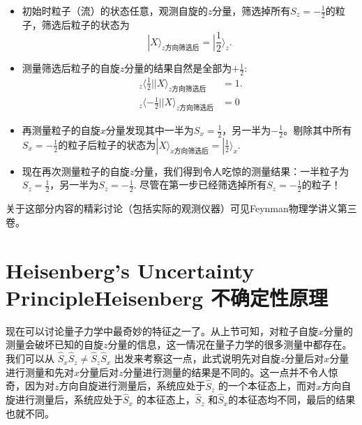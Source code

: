 \begin{itemize}
\item	初始时粒子（流）的状态任意，观测自旋的$z$分量，筛选掉所有$S_z = -\frac{1}{2}$的粒子，筛选后粒子的状态为
	\begin{equation}
		|X\rangle_{z\text{方向筛选后}} = |\frac{1}{2} \rangle_z.
	\label{equ8.58}
	\end{equation}
\item	测量筛选后粒子的自旋$z$分量的结果自然是全部为$+\frac{1}{2}$:
	\begin{align}
		\ _z\langle \frac{1}{2} || X \rangle_{z\text{方向筛选后}} &= 1.
	\label{equ8.59} \\
		\ _z \langle -\frac{1}{2} | |X \rangle_{z\text{方向筛选后}} &= 0
	\label{equ8.60}
	\end{align}
\item	再测量粒子的自旋$x$分量发现其中一半为$S_x = \frac{1}{2}$，另一半为$-\frac{1}{2}$。剔除其中所有$S_x = -\frac{1}{2}$的粒子后粒子的状态为$|X\rangle_{x\text{方向筛选后}} = |\frac{1}{2} \rangle_x$.
\item 	现在再次测量粒子的自旋$z$分量，我们得到令人吃惊的测量结果：一半粒子为$S_z = \frac{1}{2}$，另一半为$S_z = -\frac{1}{2}$. 尽管在第一步已经筛选掉所有$S_z = -\frac{1}{2}$的粒子！
\end{itemize}
关于这部分内容的精彩讨论（包括实际的观测仪器）可见Feynman物理学讲义第三卷。

\section[Heisenberg 不确定性原理]{Heisenberg’s Uncertainty PrincipleHeisenberg \quad 不确定性原理}\label{sec8.6}

现在可以讨论量子力学中最奇妙的特征之一了。从上节可知，对粒子自旋$x$分量的测量会破坏已知的自旋$z$分量的信息，这一情况在量子力学的很多测量中都存在。我们可以从 $\hat S_x \hat S_z \ne \hat S_z \hat S_x$ 出发来考察这一点，此式说明先对自旋$z$分量后对$x$分量进行测量和先对$x$分量后对$z$分量进行测量的结果是不同的。这一点并不令人惊奇，因为对$z$方向自旋进行测量后，系统应处于$\hat S_z$ 的一个本征态上，而对$x$方向自旋进行测量后，系统应处于$\hat S_x$ 的本征态上，$\hat S_z$ 和$\hat S_x$的本征态均不同，最后的结果也就不同。


